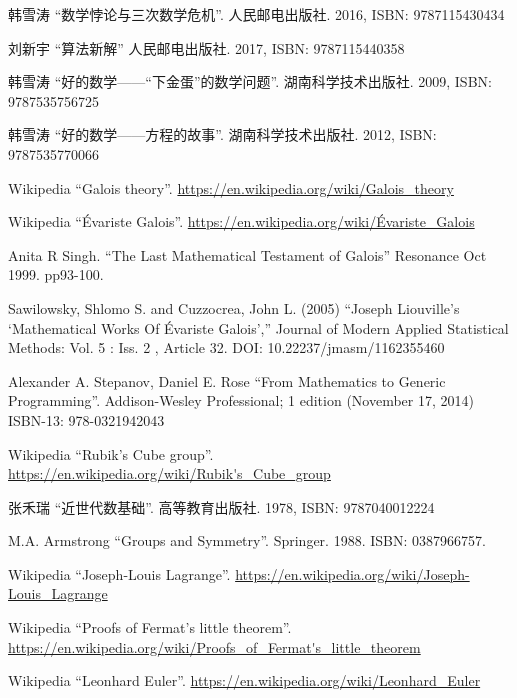 \documentclass[b5paper]{article}
\begin{document}
\ifx\wholebook\relax \else
\begin{thebibliography}{99}

{\fontspec{\cnmainft}韩雪涛 ``数学悖论与三次数学危机''. 人民邮电出版社.} 2016, ISBN: 9787115430434

{\fontspec{\cnmainft}刘新宇 ``算法新解'' 人民邮电出版社.} 2017, ISBN: 9787115440358

{\fontspec{\cnmainft}韩雪涛 ``好的数学——“下金蛋”的数学问题''. 湖南科学技术出版社.} 2009, ISBN: 9787535756725

{\fontspec{\cnmainft}韩雪涛 ``好的数学——方程的故事''. 湖南科学技术出版社.} 2012, ISBN: 9787535770066

Wikipedia ``Galois theory''. \url{https://en.wikipedia.org/wiki/Galois_theory}

Wikipedia ``Évariste Galois''. \url{https://en.wikipedia.org/wiki/Évariste_Galois}

Anita R Singh. ``The Last Mathematical Testament of Galois'' Resonance Oct 1999. pp93-100.

Sawilowsky, Shlomo S. and Cuzzocrea, John L. (2005) ``Joseph Liouville’s `Mathematical Works Of Évariste Galois','' Journal of Modern Applied Statistical Methods: Vol. 5 : Iss. 2 , Article 32. DOI: 10.22237/jmasm/1162355460

Alexander A. Stepanov, Daniel E. Rose ``From Mathematics to Generic Programming''. Addison-Wesley Professional; 1 edition (November 17, 2014) ISBN-13: 978-0321942043

Wikipedia ``Rubik's Cube group''. \url{https://en.wikipedia.org/wiki/Rubik's_Cube_group}

{\fontspec{\cnmainft}张禾瑞 ``近世代数基础''. 高等教育出版社.} 1978, ISBN: 9787040012224

M.A. Armstrong ``Groups and Symmetry''. Springer. 1988. ISBN: 0387966757.

Wikipedia ``Joseph-Louis Lagrange''. \url{https://en.wikipedia.org/wiki/Joseph-Louis_Lagrange}

Wikipedia ``Proofs of Fermat's little theorem''. \url{https://en.wikipedia.org/wiki/Proofs_of_Fermat's_little_theorem}

Wikipedia ``Leonhard Euler''. \url{https://en.wikipedia.org/wiki/Leonhard_Euler}


\end{thebibliography}
\end{document}
